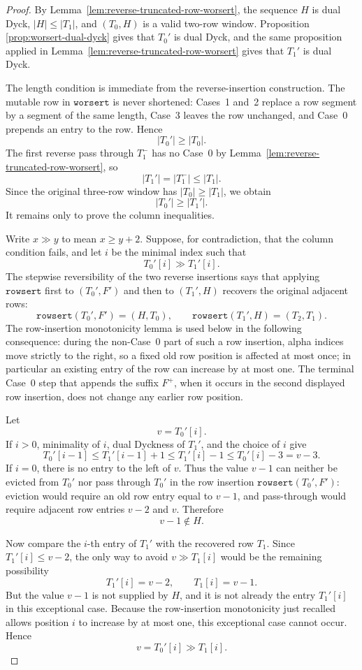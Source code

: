 \documentclass[11pt]{article}
\theoremstyle{plain}
\theoremstyle{definition}
\theoremstyle{remark}
\newcommand{\rowsert}{\texttt{rowsert}}
\newcommand{\worsert}{\texttt{worsert}}
\begin{document}
\begin{proof}
By Lemma~\ref{lem:reverse-truncated-row-worsert}, the sequence \(H\) is dual
Dyck, \(|H|\le |T_1|\), and \((T_0,H)\) is a valid two-row window.  Proposition
\ref{prop:worsert-dual-dyck} gives that \(T_0'\) is dual Dyck, and the same
proposition applied in Lemma~\ref{lem:reverse-truncated-row-worsert} gives that
\(T_1'\) is dual Dyck.

The length condition is immediate from the reverse-insertion construction.  The
mutable row in \(\worsert\) is never shortened: Cases~1 and~2 replace a row
segment by a segment of the same length, Case~3 leaves the row unchanged, and
Case~0 prepends an entry to the row.  Hence
\[
  |T_0'|\ge |T_0|.
\]
The first reverse pass through \(T_1^-\) has no Case~0 by
Lemma~\ref{lem:reverse-truncated-row-worsert}, so
\[
  |T_1'|=|T_1^-|\le |T_1|.
\]
Since the original three-row window has \(|T_0|\ge |T_1|\), we obtain
\[
  |T_0'|\ge |T_1'|.
\]
It remains only to prove the column inequalities.

Write \(x\gg y\) to mean \(x\ge y+2\).  Suppose, for contradiction, that the
column condition fails, and let \(i\) be the minimal index such that
\[
  T_0'[i]\gg T_1'[i].
\]
The stepwise reversibility of the two reverse insertions says that applying
\(\rowsert\) first to \((T_0',F')\) and then to \((T_1',H)\) recovers the
original adjacent rows:
\[
  \rowsert(T_0',F')=(H,T_0),
  \qquad
  \rowsert(T_1',H)=(T_2,T_1).
\]
The row-insertion monotonicity lemma is used below in the following
consequence: during the non-Case~0 part of such a row insertion, alpha indices
move strictly to the right, so a fixed old row position is affected at most
once; in particular an existing entry of the row can increase by at most one.
The terminal Case~0 step that appends the suffix \(F^+\), when it occurs in the
second displayed row insertion, does not change any earlier row position.

Let
\[
  v=T_0'[i].
\]
If \(i>0\), minimality of \(i\), dual Dyckness of \(T_1'\), and the choice of
\(i\) give
\[
  T_0'[i-1]\le T_1'[i-1]+1\le T_1'[i]-1\le T_0'[i]-3=v-3.
\]
If \(i=0\), there is no entry to the left of \(v\).  Thus the value \(v-1\) can
neither be evicted from \(T_0'\) nor pass through \(T_0'\) in the row insertion
\(\rowsert(T_0',F')\): eviction would require an old row entry equal to
\(v-1\), and pass-through would require adjacent row entries \(v-2\) and \(v\).
Therefore
\[
  v-1\notin H.
\]

Now compare the \(i\)-th entry of \(T_1'\) with the recovered row \(T_1\).  Since
\(T_1'[i]\le v-2\), the only way to avoid \(v\gg T_1[i]\) would be the
remaining possibility
\[
  T_1'[i]=v-2,
  \qquad
  T_1[i]=v-1.
\]
But the value \(v-1\) is not supplied by \(H\), and it is not already the entry
\(T_1'[i]\) in this exceptional case.  Because the row-insertion monotonicity
just recalled allows position \(i\) to increase by at most one, this exceptional
case cannot occur.  Hence
\[
  v=T_0'[i]\gg T_1[i].
\]


\end{proof}
\end{document}
